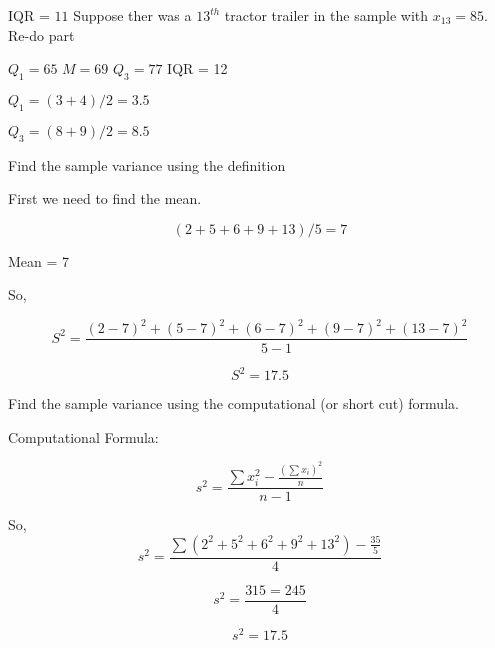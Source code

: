 \documentclass{report}
\begin{document}
\noindent \hspace{5mm}IQR = $11$
\bigbreak \noindent
{} Suppose ther was a $13^{th}$ tractor trailer in the sample with $x_{13} = 85$. Re-do part 
\vspace{3mm}

$Q_1 = 65$ \hspace{10mm} $M = 69$ \hspace{10mm} $Q_3 = 77$ \hspace{10mm} IQR = 12

\bigbreak \noindent

\vspace{3mm}

 $Q_1 = (3+4) / 2 = 3.5$
\vspace{3mm}

 $Q_3 = (8+9) / 2 = 8.5$
\bigbreak \noindent \bigbreak \noindent
{}
\pagebreak
{}
\bigbreak \noindent

 Find the sample variance using the definition
\bigbreak \noindent

First we need to find the mean.

$$(2+5+6+9+13) / 5 = 7$$

\centerline{Mean = 7}
\vspace{2mm}

So, 

$$ S^2 = \frac{(2-7)^2 + (5-7)^2 + (6-7)^2 + (9 -7)^2 + (13-7)^2}{5-1}$$

  $$ S^2 = 17.5$$
\vspace{3mm}

 Find the sample variance using the computational (or short cut) formula.
\bigbreak \noindent

Computational Formula:

$$s^2=\frac{\sum x_i^2-\frac{\left(\sum x_i\right)^2}{n}}{n-1}$$
\vspace{3mm}

So,
$$s^2  = \frac{\sum{(2^2+5^2+6^2+9^2+13^2)} - \frac{35}{5}}{4}$$

$$ s^2 = \frac{315 = 245}{4}$$

$$ s^2 = 17.5$$
\vspace{3mm}
\end{document}

